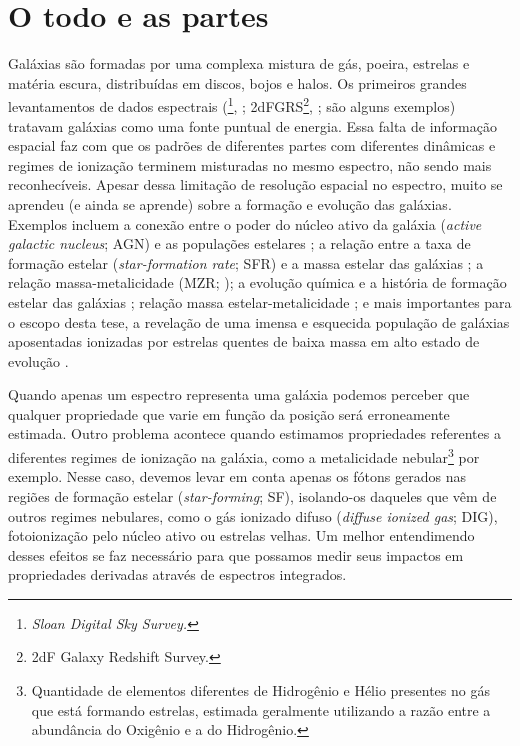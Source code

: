 \section{O todo e as partes}
\label{sec:intro:partes}

Galáxias são formadas por uma complexa mistura de gás, poeira, estrelas e matéria escura, distribuídas em discos, bojos e halos. Os primeiros grandes levantamentos de dados espectrais (\SDSS\footnote{\em Sloan Digital Sky Survey.}, \citealt{York.etal.2000a}; 2dFGRS\footnote{2dF Galaxy Redshift Survey.}, \citealt{Colless.etal.2001a}; são alguns exemplos) tratavam galáxias como uma fonte puntual de energia. Essa falta de informação espacial faz com que os padrões de diferentes partes com diferentes dinâmicas e regimes de ionização terminem misturadas no mesmo espectro, não sendo mais reconhecíveis. Apesar dessa limitação de resolução espacial no espectro, muito se aprendeu (e ainda se aprende) sobre a formação e evolução das galáxias. Exemplos incluem a conexão entre o poder do núcleo ativo da galáxia ({\em active galactic nucleus}; AGN) e as populações estelares \citep{Kauffmann.etal.2003a}; a relação entre a taxa de formação estelar ({\em star-formation rate}; SFR) e a massa estelar das galáxias \citep{Brinchmann.etal.2004a}; a relação massa-metalicidade (MZR; \citealt{Tremonti.etal.2004a}); a evolução química e a história de formação estelar das galáxias \citep{CidFernandes.etal.2007, Asari.etal.2007a}; relação massa estelar-metalicidade \citep{ValeAsari.etal.2009a}; e mais importantes para o escopo desta tese, a revelação de uma imensa e esquecida população de galáxias aposentadas ionizadas por estrelas quentes de baixa massa em alto estado de evolução \citep[{\em hot low-mass evolved stars};][ HOLMES]{Stasinska.etal.2008a, CidFernandes.etal.2010a, CidFernandes.etal.2011a}.

Quando apenas um espectro representa uma galáxia podemos perceber que qualquer propriedade que varie em função da posição será erroneamente estimada. Outro problema acontece quando estimamos propriedades referentes a diferentes regimes de ionização na galáxia, como a metalicidade nebular\footnote{Quantidade de elementos diferentes de Hidrogênio e Hélio presentes no gás que está formando estrelas, estimada geralmente utilizando a razão entre a abundância do Oxigênio e a do Hidrogênio.} por exemplo. Nesse caso, devemos levar em conta apenas os fótons gerados nas regiões de formação estelar ({\em star-forming}; SF), isolando-os daqueles que vêm de outros regimes nebulares, como o gás ionizado difuso ({\em diffuse ionized gas}; DIG), fotoionização pelo núcleo ativo ou estrelas velhas. Um melhor entendimendo desses efeitos se faz necessário para que possamos medir seus impactos em propriedades derivadas através de espectros integrados.

